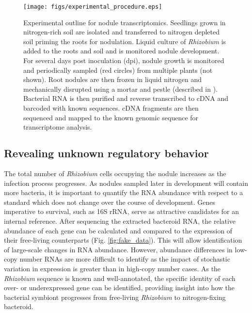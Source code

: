 \begin{figure}
	\centerline{\texttt{[image: figs/experimental\_procedure.eps]}}
	\caption{Experimental outline for nodule transcriptomics. Seedlings
		grown in nitrogen-rich soil are isolated and transferred to
		nitrogen depleted soil priming the roots for nodulation. Liquid
		culture of \textit{Rhizobium} is added to the roots and soil and
		is monitored nodule development. For several days post
		inoculation (dpi), nodule growth is monitored and periodically
		sampled (red circles) from multiple plants (not shown). Root nodules are then
		frozen in liquid nitrogen and mechanically disrupted using a
		mortar and pestle (described in \cite{Vercruysse:2010ji}).
		Bacterial RNA is then purified and reverse transcribed to cDNA
		and barcoded with known sequences. cDNA fragments are then
		sequenced and mapped to the known genomic sequence for
		transcriptome analysis.} 
\label{fig:experimental_procedure}
\end{figure}

\subsection*{Revealing unknown regulatory behavior }
\indent The total number of \textit{Rhizobium} cells occupying the nodule increases as
the infection process progresses. As nodules sampled later in development will
contain more bacteria, it is important to quantify the RNA abundance with
respect to a standard which does not change over the course of development.
Genes imperative to survival, such as 16S rRNA, serve as attractive candidates
for an internal reference. After sequencing the extracted bacteroid
RNA, the relative abundance of each gene can be calculated and compared to the
expression of their free-living counterparts (Fig. \ref{fig:fake_data}). This
will allow identification of large-scale changes in RNA abundance. However,
abundance differences in low-copy number RNAs are more difficult to identify as the impact
of stochastic variation in expression is greater than in high-copy number cases.
As the \textit{Rhizobium} sequence is known and well-annotated, the specific
identity of each over- or underexpressed gene can be identified, providing
insight into how the bacterial symbiont progresses from free-living
\textit{Rhizobium} to  nitrogen-fixing bacteroid.

